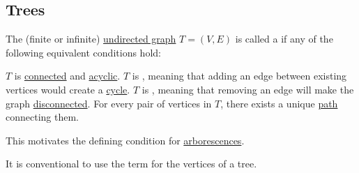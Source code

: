 \subsection{Trees}\label{subsec:trees}

\begin{definition}\label{def:tree}
  The (finite or infinite) \hyperref[def:graph/undirected]{undirected graph} \( T = (V, E) \) is called a  if any of the following equivalent conditions hold:
  \begin{thmenum}
     \( T \) is \hyperref[def:graph_connectedness]{connected} and \hyperref[def:graph_cycle]{acyclic}.
     \( T \) is , meaning that adding an edge between existing vertices would create a \hyperref[def:graph_cycle]{cycle}.
     \( T \) is , meaning that removing an edge will make the graph \hyperref[def:graph_connectedness]{disconnected}.
     For every pair of vertices in \( T \), there exists a unique \hyperref[def:graph_directed_path]{path} connecting them.

    This motivates the defining condition for \hyperref[def:arborescence]{arborescences}.
  \end{thmenum}

  It is conventional to use the term  for the vertices of a tree.
\end{definition}
